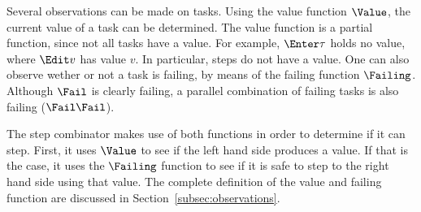 Several observations can be made on tasks.
Using the value function $\Value$, the current value of a task can be determined.
The value function is a partial function, since not all tasks have a value.
For example, $\Enter \tau$ holds no value,
where $\Edit v$ has value $v$.
In particular, steps do not have a value.
One can also observe wether or not a task is failing, by means of the failing function $\Failing$.
Although $\Fail$ is clearly failing,
a parallel combination of failing tasks is also failing ($\Fail \And \Fail$).

The step combinator makes use of both functions in order to determine if it can step.
First, it uses $\Value$ to see if the left hand side produces a value.
If that is the case, it uses the $\Failing$ function to see if it is safe to step to the right hand side using that value.
The complete definition of the value and failing function are discussed in Section~\ref{subsec:observations}.
